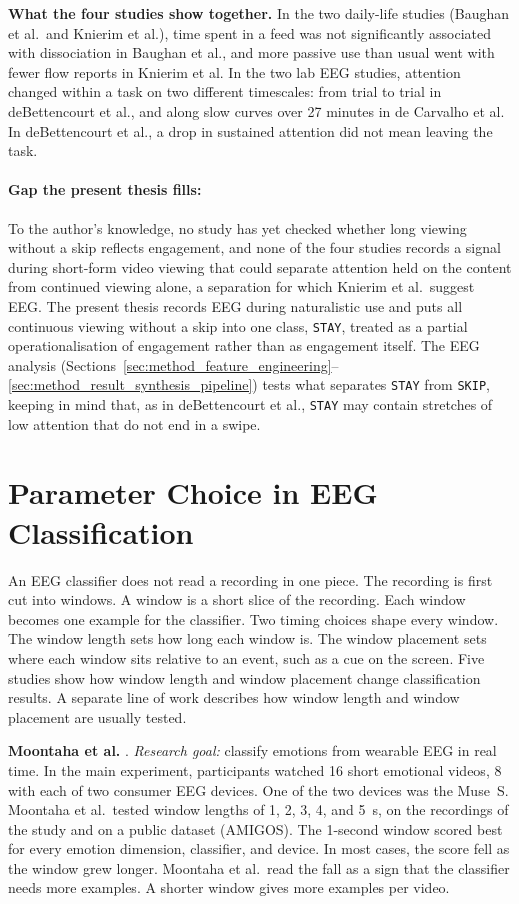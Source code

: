 \documentclass[12pt,a4paper]{report}
\begin{document}
\textbf{What the four studies show together.} In the two daily-life studies (Baughan et al.\ and Knierim et al.), time spent in a feed was not significantly associated with dissociation in Baughan et al., and more passive use than usual went with fewer flow reports in Knierim et al. In the two lab EEG studies, attention changed within a task on two different timescales: from trial to trial in deBettencourt et al., and along slow curves over 27 minutes in de Carvalho et al. In deBettencourt et al., a drop in sustained attention did not mean leaving the task.

\paragraph{Gap the present thesis fills:} To the author's knowledge, no study has yet checked whether long viewing without a skip reflects engagement, and none of the four studies records a signal during short-form video viewing that could separate attention held on the content from continued viewing alone, a separation for which Knierim et al.\ suggest EEG. The present thesis records EEG during naturalistic use and puts all continuous viewing without a skip into one class, \texttt{STAY}, treated as a partial operationalisation of engagement rather than as engagement itself. The EEG analysis (Sections~\ref{sec:method_feature_engineering}--\ref{sec:method_result_synthesis_pipeline}) tests what separates \texttt{STAY} from \texttt{SKIP}, keeping in mind that, as in deBettencourt et al., \texttt{STAY} may contain stretches of low attention that do not end in a swipe.

\section{Parameter Choice in EEG Classification}
\label{sec:lit_parameter_choice}
An EEG classifier does not read a recording in one piece. The recording is first cut into windows. A window is a short slice of the recording. Each window becomes one example for the classifier. Two timing choices shape every window. The window length sets how long each window is. The window placement sets where each window sits relative to an event, such as a cue on the screen. Five studies show how window length and window placement change classification results. A separate line of work describes how window length and window placement are usually tested.

\textbf{Moontaha et al.} \cite{moontaha_online_2023-1}. \emph{Research goal:} classify emotions from wearable EEG in real time. In the main experiment, participants watched 16 short emotional videos, 8 with each of two consumer EEG devices. One of the two devices was the Muse~S. Moontaha et al.\ tested window lengths of 1, 2, 3, 4, and 5~s, on the recordings of the study and on a public dataset (AMIGOS). The 1-second window scored best for every emotion dimension, classifier, and device. In most cases, the score fell as the window grew longer. Moontaha et al.\ read the fall as a sign that the classifier needs more examples. A shorter window gives more examples per video.
\end{document}

